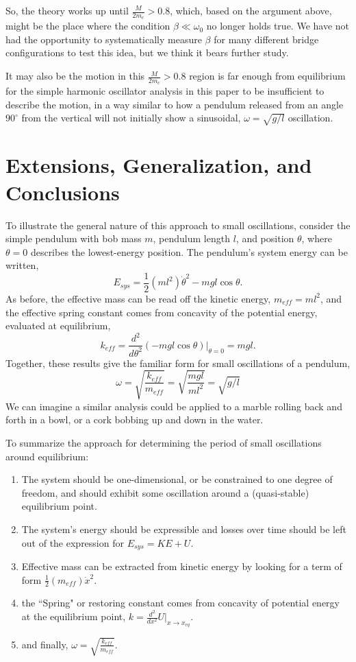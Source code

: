 \documentclass[12pt]{iopart}
\newcommand{\be}{\begin{equation}}
\newcommand{\ee}{\end{equation}}
\begin{document}
So, the theory works up until $\frac{M}{2m_c}>0.8$, which, based on the argument above, might be the place where the condition $\beta \ll \omega_0$ no longer holds true.   We have not had the opportunity to systematically measure $\beta$ for many different bridge configurations to test this idea, but we think it bears further study.  

It may also be the motion in this $\frac{M}{2m_c}>0.8$ region is far enough from equilibrium for the simple harmonic oscillator analysis in this paper to be insufficient to describe the motion, in a way similar to how a pendulum released from an angle $90^{\circ}$ from the vertical will not initially show a sinusoidal, $\omega=\sqrt{g/l}$ oscillation.
%
%

\section{Extensions, Generalization, and Conclusions}
To illustrate the general nature of this approach to small oscillations, consider the simple pendulum with bob mass $m$, pendulum length $l$, and position $\theta$, where $\theta=0$ describes the lowest-energy position.  The pendulum's system energy can be written,
\be
E_{sys}=\frac{1}{2}\left(m l^2 \right) \dot{\theta}^2-mgl\cos \theta.
\ee 
As before, the effective mass can be read off the kinetic energy, 
$m_{eff}=ml^2$, 
and the effective spring constant comes from concavity of the potential energy, evaluated at equilibrium,
\be
k_{eff}=\frac{ d^2 }{ d \theta ^2 } (-m g l \cos \theta) |_{\theta=0}=mgl.
\ee
Together, these results give the familiar form for small oscillations of a pendulum, 
\be
\omega=\sqrt{\frac{k_{eff}}{m_{eff}}} = \sqrt{\frac{mgl}{m l^2}}=\sqrt{g/l}
\ee
We can imagine a similar analysis could be applied to a marble rolling back and forth in a bowl, or a cork bobbing up and down in the water. 

To summarize the approach for determining the period of small oscillations around equilibrium:
\begin{enumerate}
\item The system should be one-dimensional, or be constrained to one degree of freedom, and should exhibit some oscillation around a (quasi-stable) equilibrium point.
\item The system's energy should be expressible and losses over time should be left out of the expression for 
$E_{sys}=KE+U$.
\item Effective mass can be extracted from kinetic energy by looking for a term of form 
$\frac{1}{2}\left(m_{eff}\right) \dot{x}^2$.
\item the ``Spring" or restoring constant comes from concavity of potential energy at the equilibrium point, 
$k=\frac{d^2}{dx^2}U|_{x\to x_{eq}}$.
\item and finally, $\omega=\sqrt{\frac{k_{eff}}{m_{eff}}}$.
\end{enumerate}
\end{document}
